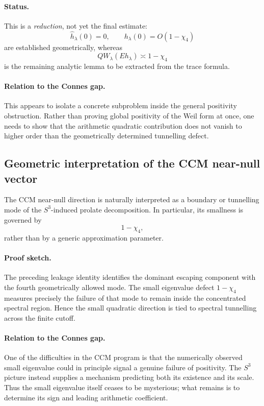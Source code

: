 \paragraph{Status.}
This is a \emph{reduction}, not yet the final estimate:
\[
    \boxed{
    \widehat h_\lambda(0)=0,\qquad
    h_\lambda(0)=O(1-\chi_4)
    }
\]
are established geometrically, whereas
\[
    \boxed{
    QW_\lambda(Eh_\lambda)\asymp1-\chi_4
    }
\]
is the remaining analytic lemma to be extracted from the trace formula.
\paragraph{Relation to the Connes gap.}
This appears to isolate a concrete subproblem inside the general positivity
obstruction.  Rather than proving global positivity of the Weil form at once,
one needs to show that the arithmetic quadratic contribution does not vanish
to higher order than the geometrically determined tunnelling defect.
\subsection{Geometric interpretation of the CCM near-null vector}
\begin{proposition}
The CCM near-null direction is naturally interpreted as a boundary or
tunnelling mode of the \(S^3\)-induced prolate decomposition.  In particular,
its smallness is governed by
\[
    1-\chi_4,
\]
rather than by a generic approximation parameter.
\end{proposition}
\paragraph{Proof sketch.}
The preceding leakage identity identifies the dominant escaping component
with the fourth geometrically allowed mode.  The small eigenvalue defect
\(1-\chi_4\) measures precisely the failure of that mode to remain inside the
concentrated spectral region.  Hence the small quadratic direction is tied
to spectral tunnelling across the finite cutoff.
\paragraph{Relation to the Connes gap.}
One of the difficulties in the CCM program is that the numerically observed
small eigenvalue could in principle signal a genuine failure of positivity.
The \(S^3\) picture instead supplies a mechanism predicting both its existence
and its scale.  Thus the small eigenvalue itself ceases to be mysterious;
what remains is to determine its sign and leading arithmetic coefficient.
